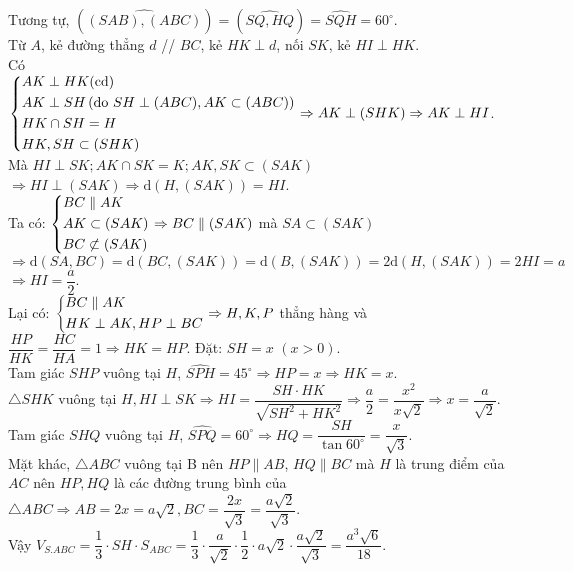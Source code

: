 \begin{ex}
{		Tương tự, $\left(\widehat{(SAB),(ABC)}\right)=\left(\widehat{SQ,HQ}\right)=\widehat{SQH}=60^{\circ}$.\\
		Từ $A$, kẻ đường thẳng $d$ // $BC$, kẻ $HK\perp d$, nối $SK$, kẻ $HI\perp HK$.\\
		Có $\left\{\begin{aligned}&AK\perp HK(\rm{cd})\\&AK\perp SH\left(\text{do } SH\perp(ABC), AK\subset(ABC)\right)\\&HK\cap SH=H\\&HK,SH\subset(SHK)\end{aligned}\right.\Rightarrow AK\perp(SHK)\Rightarrow AK\perp HI$.\\
		Mà $HI\perp SK; AK\cap SK=K; AK,SK\subset(SAK)$ \\
		$ \Rightarrow HI\perp(SAK)\Rightarrow\mathrm{d}\left(H,(SAK)\right)=HI $.\\
		Ta có: $\left\{\begin{aligned}&BC\parallel AK\\&AK\subset(SAK)\\&BC\not\subset(SAK)\end{aligned}\right.\Rightarrow BC\parallel (SAK)$ mà $SA\subset(SAK)$ \\
		$ \Rightarrow\mathrm{d}(SA,BC)=\mathrm{d}\left(BC,(SAK)\right)=\mathrm{d}\left(B,(SAK)\right)=2\mathrm{d}\left(H,(SAK)\right)=2HI=a $ \\
		$ \Rightarrow HI=\dfrac{a}{2} $.\\
		Lại có: $\left\{\begin{aligned}&BC\parallel AK\\&HK\perp AK, HP\perp BC\end{aligned}\right.\Rightarrow H,K,P$ thẳng hàng và $\dfrac{HP}{HK}=\dfrac{HC}{HA}=1\Rightarrow HK=HP$. Đặt: $SH=x$ $(x>0)$.\\
		Tam giác $SHP$ vuông tại $H$, $\widehat{SPH}=45^{\circ}\Rightarrow HP=x\Rightarrow HK=x$.\\
		$\triangle SHK$ vuông tại $H, HI\perp SK\Rightarrow HI=\dfrac{SH\cdot HK}{\sqrt{SH^2+HK^2}}\Rightarrow\dfrac{a}{2}=\dfrac{x^2}{x\sqrt{2}}\Rightarrow x=\dfrac{a}{\sqrt{2}}$.\\
		Tam giác $SHQ$ vuông tại $H$, $\widehat{SPQ}=60^{\circ}\Rightarrow HQ=\dfrac{SH}{\tan{60}^{\circ}}=\dfrac{x}{\sqrt{3}}$.\\
		Mặt khác, $\triangle ABC$ vuông tại B nên $HP \parallel AB$, $HQ \parallel BC$ mà $H$ là trung điểm của $AC$ nên $HP, HQ$ là các đường trung bình của $\triangle ABC\Rightarrow AB=2x=a\sqrt{2}, BC=\dfrac{2x}{\sqrt{3}}=\dfrac{a\sqrt{2}}{\sqrt{3}}$.\\
		Vậy $V_{S.ABC}=\dfrac{1}{3}\cdot SH\cdot S_{ABC}=\dfrac{1}{3}\cdot\dfrac{a}{\sqrt{2}}\cdot\dfrac{1}{2}\cdot a\sqrt{2}\cdot\dfrac{a\sqrt{2}}{\sqrt{3}}=\dfrac{a^3\sqrt{6}}{18}$.}
\end{ex}
